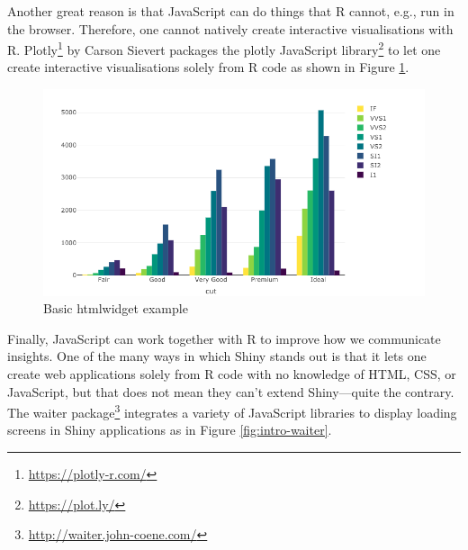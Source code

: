 \documentclass[10pt,]{krantz}
\makeatletter
\newenvironment{Shaded}{\begin{snugshade}}{\end{snugshade}}
\newcommand{\DataTypeTok}[1]{\textcolor[rgb]{0.27,0.27,0.27}{#1}}
\newcommand{\KeywordTok}[1]{\textcolor[rgb]{0.27,0.27,0.27}{\textbf{#1}}}
\newcommand{\NormalTok}[1]{#1}
\newcommand{\OperatorTok}[1]{\textcolor[rgb]{0.43,0.43,0.43}{\textbf{#1}}}
\newcommand{\StringTok}[1]{\textcolor[rgb]{0.5,0.5,0.5}{#1}}
\renewcommand{\href}[2]{#2\footnote{\url{#1}}}
\newenvironment{kframe}{%
\medskip{}
\setlength{\fboxsep}{.8em}
 \def\at@end@of@kframe{}%
 \ifinner\ifhmode%
  \def\at@end@of@kframe{\end{minipage}}%
  \begin{minipage}{\columnwidth}%
 \fi\fi%
 \def\FrameCommand##1{\hskip\@totalleftmargin \hskip-\fboxsep
 \colorbox{shadecolor}{##1}\hskip-\fboxsep
     \hskip-\linewidth \hskip-\@totalleftmargin \hskip\columnwidth}%
 \MakeFramed {\advance\hsize-\width
   \@totalleftmargin\z@ \linewidth\hsize
   \@setminipage}}%
 {\par\unskip\endMakeFramed%
 \at@end@of@kframe}
\renewenvironment{Shaded}{\begin{kframe}}{\end{kframe}}
\makeatother
\begin{document}
Another great reason is that JavaScript can do things that R cannot, e.g., run in the browser. Therefore, one cannot natively create interactive visualisations with R. \href{https://plotly-r.com/}{Plotly} \citep{R-plotly} by Carson Sievert packages the \href{https://plot.ly/}{plotly JavaScript library} to let one create interactive visualisations solely from R code as shown in Figure \ref{fig:plotly-basic-example}.

\begin{Shaded}
\end{Shaded}

\begin{figure}[H]

{\centering \includegraphics[width=1\linewidth]{images/01-plotly} 

}

\caption{Basic htmlwidget example}\label{fig:plotly-basic-example}
\end{figure}

Finally, JavaScript can work together with R to improve how we communicate insights. One of the many ways in which Shiny stands out is that it lets one create web applications solely from R code with no knowledge of HTML, CSS, or JavaScript, but that does not mean they can't extend Shiny---quite the contrary. The \href{http://waiter.john-coene.com/}{waiter package} \citep{R-waiter} integrates a variety of JavaScript libraries to display loading screens in Shiny applications as in Figure \ref{fig:intro-waiter}.
\end{document}
